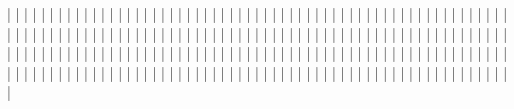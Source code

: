                |       |       |
               |       |       |
               |       |       |
               |       |       |
               |       |       |
               |       |       |
               |       |       |
               |       |       |
               |       |       |
               |       |       |
               |       |       |
               |       |       |
               |       |       |
               |       |       |
               |       |       |
               |       |       |
               |       |       |
               |       |       |
               |       |       |
               |       |       |
               |       |       |
               |       |       |
               |       |       |
               |       |       |
               |       |       |
               |       |       |
               |       |       |
               |       |       |
               |       |       |
               |       |       |
               |       |       |
               |       |       |
               |       |       |
               |       |       |
               |       |       |
               |       |       |
               |       |       |
               |       |       |
               |       |       |
               |       |       |
               |       |       |
               |       |       |
               |       |       |
               |       |       |
               |       |       |
               |       |       |
               |       |       |
               |       |       |
               |       |       |
               |       |       |
               |       |       |
               |       |       |
               |       |       |
               |       |       |
               |       |       |
               |       |       |
               |       |       |
               |       |       |
               |       |       |
               |       |       |
               |       |       |
               |       |       |
               |       |       |
               |       |       |
               |       |       |
               |       |       |
               |       |       |
               |       |       |
               |       |       |
               |       |       |
               |       |       |
               |       |       |
               |       |       |
               |       |       |
               |       |       |
               |       |       |
               |       |       |
               |       |       |
               |       |       |
